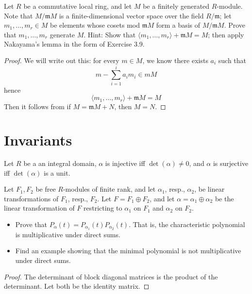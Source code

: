 \documentclass[openany]{book}
\newcommand{\la}{\langle}
\newcommand{\ra}{\rangle}
\begin{document}
\begin{prob}[3.10]
    Let \( R \) be a commutative local ring, and let \( M \) be a finitely generated \( R \)-module. Note that \( M/\mathfrak{m}M \) is a finite-dimensional vector space over the field \( R/\mathfrak{m} \); let \( m_1, \ldots, m_r \in M \) be elements whose cosets mod \( \mathfrak{m}M \) form a basis of \( M/\mathfrak{m}M \). Prove that \( m_1, \ldots, m_r \) generate \( M \). Hint: Show that \(\langle m_1, \ldots, m_r \rangle + \mathfrak{m}M = M\); then apply Nakayama's lemma in the form of Exercise 3.9.
\end{prob}
\begin{proof}
    We will write out this: for every $m\in M$, we know there exists $a_i$ such that
    \begin{equation*}
        m-\sum_{i=1}^ia_{i}m_i\in mM
    \end{equation*}
    hence 
    \begin{equation*}
        \la m_1,\dots, m_r\ra+\mathfrak{m}M=M
    \end{equation*}
    Then it follows from if $M=\mathfrak{m}M+N$, then $M=N$.
\end{proof}







\section{Invariants}
\begin{prop}
    Let $R$ be a an integral domain, $\alpha$ is injective iff $\det(\alpha)\neq 0$, and $\alpha$ is surjective iff $\det(\alpha)$ is a unit.
\end{prop}

\begin{prob}[6.10]
    Let \( F_1, F_2 \) be free \( R \)-modules of finite rank, and let \( \alpha_1 \), resp., \( \alpha_2 \), be linear transformations of \( F_1 \), resp., \( F_2 \). Let \( F = F_1 \oplus F_2 \), and let \( \alpha = \alpha_1 \oplus \alpha_2 \) be the linear transformation of \( F \) restricting to \( \alpha_1 \) on \( F_1 \) and \( \alpha_2 \) on \( F_2 \).

    \begin{itemize}
        \item Prove that \( P_\alpha(t) = P_{\alpha_1}(t)P_{\alpha_2}(t) \). That is, the characteristic polynomial is multiplicative under direct sums.
    
        \item Find an example showing that the minimal polynomial is not multiplicative under direct sums.
    \end{itemize}
\end{prob}
\begin{proof}
    The determinant of block diagonal matrices is the product of the determinant. Let both be the identity matrix.
\end{proof}
\end{document}
